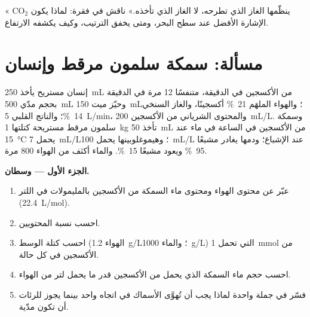 \begin{exercise}[$\star\star\star$]\label{exo:b1:gas-exchange:12}
« ينظّمها الغاز الذي تطرحه، لا الغاز الذي تأخذه.» ناقش في
فقرة: لماذا يكون $\mathrm{CO_2}$ الإشارة الأفضل عند سطح البحر،
ومتى يخفق الترتيب، وكيف يكشفه الارتفاع.
\end{exercise}

\section{مسألة: سمكة سلمون مرقط وإنسان}

\begin{problem}
\label{pb:b1:gas-exchange:1}
إنسان مستريح يأخذ \qty{250}{mL} من الأكسجين في الدقيقة، متنفسًا
\qty{12}{} مرة في الدقيقة بحجم مدّي \qty{500}{mL} وحيّز ميت
\qty{150}{mL}؛ والهواء الملهَم \qty{21}{\%} أكسجينًا، والغاز
السنخي \qty{14}{\%}؛ والناتج القلبي \qty{5}{L/min}، والمحتوى
الشرياني من الأكسجين \qty{200}{mL/L}. وسمكة سلمون مرقط مستريحة
كتلتها \qty{1}{kg} تأخذ \qty{50}{mL} من الأكسجين في الساعة في ماء
عند \qty{15}{\celsius} يحمل \qty{7}{mL/L}؛ وهيموغلوبينها يحمل
\qty{100}{mL/L} عند الإشباع؛ ودمها يغادر  مشبعًا
\qty{95}{\%} ويعود مشبعًا \qty{15}{\%}. والماء أكثف من الهواء
\qty{800}{} مرة.

\medskip
\noindent\textbf{الجزء الأول --- وسطان.}
\begin{enumerate}
  \item عبّر عن محتوى الهواء ومحتوى ماء السمكة من الأكسجين
        بالمليمولات في اللتر (\qty{22.4}{L/mol}).
  \item احسب نسبة المحتويين.
  \item احسب كتلة الوسط (الهواء \qty{1.2}{g/L}؛ والماء
        \qty{1000}{g/L}) التي تحمل \qty{1}{mmol} من الأكسجين في كل
        حالة.
  \item احسب حجم ماء السمكة الذي يحمل من الأكسجين قدر ما يحمل لتر
        من الهواء.
  \item فسّر في جملة واحدة لماذا يجب أن تُهوَّى  الأسماك في
        اتجاه واحد بينما يجوز للرئات أن تكون مدّية.
\end{enumerate}


\end{problem}
